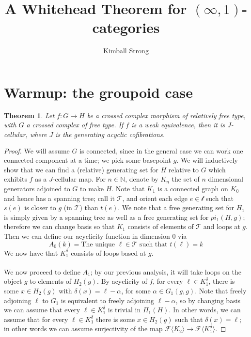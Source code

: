 \documentclass[12pt]{article}
\newtheorem{theorem}{Theorem}[section]
\theoremstyle{definition}
\begin{document}
\author{Kimball Strong}
\date{}

\title{\vspace{-1in} A Whitehead Theorem for $(\infty,1)$-categories\\ \vspace{.1in}}

\maketitle
\section{Warmup: the groupoid case}
	\begin{theorem}
		Let $f: G \to H$ be a crossed complex morphism of relatively free type, with $G$ a crossed complex of free type. 
		If $f$ is a weak equivalence, then it is $J$-cellular, where $J$ is the generating acyclic cofibrations.
	\end{theorem}
	\begin{proof}
		We will assume $G$ is connected, since in the general case we can work one connected component at a time; we pick some basepoint $g$.
		We will inductively show that we can find a (relative) generating set for $H$ relative to $G$ which exhibits $f$ as a $J$-cellular map.
		For $n \in \mathbb{N}$, denote by $K_n$ the set of $n$ dimensional generators adjoined to $G$ to make $H$. 
		Note that $K_1$ is a connected graph on $K_0$ and hence has a spanning tree; call it $\mathcal{T}$, and orient each edge $e \in \mathcal{t}$ such that $s(e)$ is closer to $g$ (in $\mathcal{T}$) than $t(e)$. 
		We note that a free generating set for $H_1$ is simply given by a spanning tree as well as a free generating set for $pi_1(H,g)$; therefore we can change basis so that $K_1$ consists of elements of $\mathcal{T}$ and loops at $g$.
		Then we can define our acyclicity function in dimension $0$ via
		$$A_0(k) = \text{The unique } \ell \in \mathcal{T} \text{ such that } t(\ell) = k$$ 
		We now have that $K_1^\delta$ consists of loops based at $g$.
		\\\\
		We now proceed to define $A_1$; by our previous analysis, it will take loops on the object $g$ to elements of $H_2(g)$. 
		By acyclicity of $f$, for every $\ell \in K_1^\delta$, there is some $x \in H_2(g)$ with $\delta(x) = \ell - \alpha$, for some $\alpha \in G_1(g,g)$. Note that freely adjoining $\ell$ to $G_1$ is equivalent to freely adjoining $\ell - \alpha$, so by changing basis we can assume that every $\ell \in K_1^\delta$ is trivial in $\Pi_1(H)$.
		In other words, we can assume that for every $\ell \in K_1^\delta$ there is some $x \in H_2(g)$ such that $\delta(x) = \ell$; in other words we can assume surjectivity of the map $\mathcal{F}\langle K_2 \rangle \to \mathcal{F}\langle K_1^\delta \rangle$.
	\end{proof}
\end{document}
